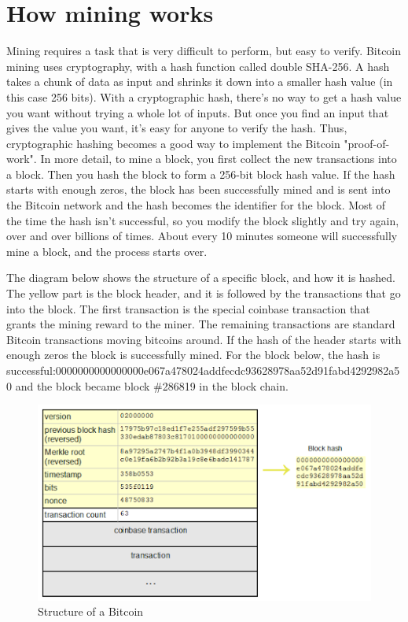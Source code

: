 \section{How mining works}
Mining requires a task that is very difficult to perform, but easy to verify. Bitcoin mining uses cryptography, with a hash function called double SHA-256. A hash takes a chunk of data as input and shrinks it down into a smaller hash value (in this case 256 bits). With a cryptographic hash, there's no way to get a hash value you want without trying a whole lot of inputs. But once you find an input that gives the value you want, it's easy for anyone to verify the hash. Thus, cryptographic hashing becomes a good way to implement the Bitcoin "proof-of-work".
In more detail, to mine a block, you first collect the new transactions into a block. Then you hash the block to form a 256-bit block hash value. If the hash starts with enough zeros, the block has been successfully mined and is sent into the Bitcoin network and the hash becomes the identifier for the block. Most of the time the hash isn't successful, so you modify the block slightly and try again, over and over billions of times. About every 10 minutes someone will successfully mine a block, and the process starts over.

The diagram below shows the structure of a specific block, and how it is hashed. The yellow part is the block header, and it is followed by the transactions that go into the block. The first transaction is the special coinbase transaction that grants the mining reward to the miner. The remaining transactions are standard Bitcoin transactions moving bitcoins around. If the hash of the header starts with enough zeros the block 
is successfully mined. For the block below, the hash is successful:0000000000000000e067a478024addfecdc93628978aa52d91fabd4292982a50 and the block became block \#286819 in the block chain.

\begin{figure}[ht!]
\centering
\includegraphics[trim = 0mm 0mm 0mm 0mm, width=120mm]{images/structure_of_bitcoin_block}
\caption{Structure of a Bitcoin}
\end{figure}

